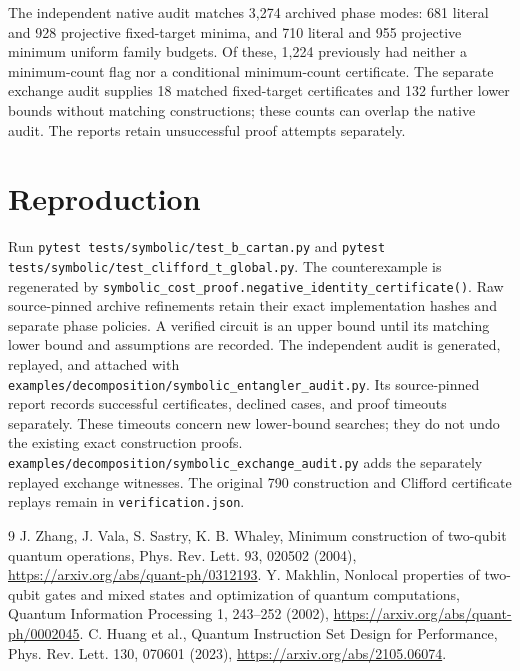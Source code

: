 \documentclass[11pt]{article}
\begin{document}
The independent native audit matches 3,274 archived phase modes: 681 literal
and 928 projective fixed-target minima, and 710 literal and 955 projective
minimum uniform family budgets. Of these, 1,224 previously had neither a
minimum-count flag nor a conditional minimum-count certificate. The separate
exchange audit supplies 18 matched fixed-target certificates and 132 further
lower bounds without matching constructions; these counts can overlap the
native audit. The reports retain unsuccessful proof attempts separately.

\section{Reproduction}
Run \nolinkurl{pytest tests/symbolic/test_b_cartan.py}
and \nolinkurl{pytest tests/symbolic/test_clifford_t_global.py}.
The counterexample is regenerated by
\nolinkurl{symbolic_cost_proof.negative_identity_certificate()}.
Raw source-pinned archive refinements retain their exact implementation hashes
and separate phase policies. A verified circuit is an upper bound until its
matching lower bound and assumptions are recorded.
The independent audit is generated, replayed, and attached with
\nolinkurl{examples/decomposition/symbolic_entangler_audit.py}.
Its source-pinned report records successful certificates, declined cases,
and proof timeouts separately. These timeouts concern new lower-bound
searches; they do not undo the existing exact construction proofs.
\nolinkurl{examples/decomposition/symbolic_exchange_audit.py} adds the
separately replayed exchange witnesses. The original 790 construction and
Clifford certificate replays remain in \nolinkurl{verification.json}.

\begin{thebibliography}{9}
 J. Zhang, J. Vala, S. Sastry, K. B. Whaley,
Minimum construction of two-qubit quantum operations,
Phys. Rev. Lett. 93, 020502 (2004),
\url{https://arxiv.org/abs/quant-ph/0312193}.
 Y. Makhlin, Nonlocal properties of two-qubit gates and mixed
states and optimization of quantum computations,
Quantum Information Processing 1, 243--252 (2002),
\url{https://arxiv.org/abs/quant-ph/0002045}.
 C. Huang et al., Quantum Instruction Set Design for Performance,
Phys. Rev. Lett. 130, 070601 (2023),
\url{https://arxiv.org/abs/2105.06074}.
\end{thebibliography}
\end{document}
